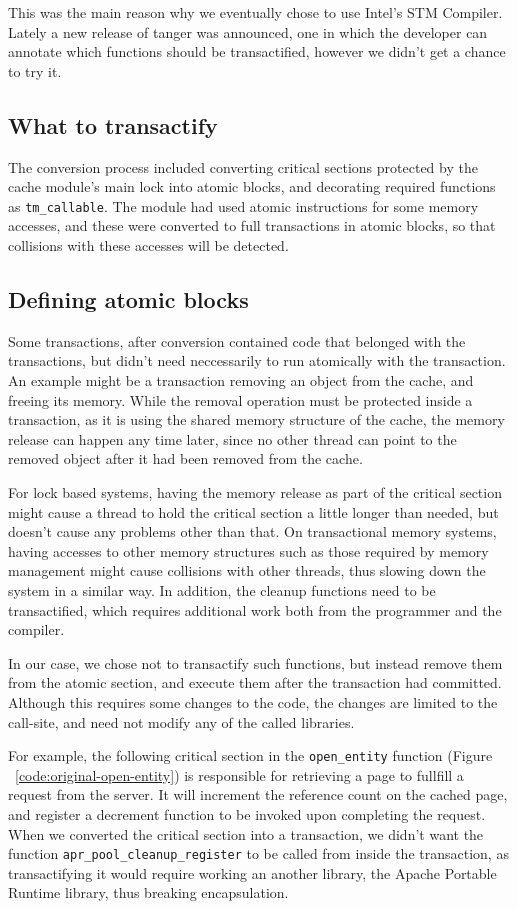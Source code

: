 \documentclass[preprint,natbib,11pt]{sigplanconf}
\begin{document}
This was the main reason why we eventually chose to use Intel's STM Compiler.
Lately a new release of tanger was announced, one in which the developer can
annotate which functions should be transactified, however we didn't get a
chance to try it.

\subsection{What to transactify}
The conversion process included
converting critical sections protected by the cache module's main lock into
atomic blocks, and decorating required functions as {\tt tm\_callable}. The
module had used atomic instructions for some memory accesses, and these were
converted to full transactions in atomic blocks, so that collisions with these
accesses will be detected.

\subsection{Defining atomic blocks}
Some transactions, after conversion contained code that belonged with the
transactions, but didn't need neccessarily to run atomically with the
transaction. An example might be a transaction removing an object from the
cache, and freeing its memory. While the removal operation must be protected
inside a transaction, as it is using the shared memory structure of the cache,
the memory release can happen any time later, since no other thread can point to
the removed object after it had been removed from the cache. 

For lock based systems, having the memory release as part of the critical
section might cause a thread to hold the critical section a little longer than
needed, but doesn't cause any problems other than that. On transactional memory
systems, having accesses to other memory structures such as those required by
memory management might cause collisions with other threads, thus slowing down
the system in a similar way. In addition, the cleanup functions need to be
transactified, which requires additional work both from the programmer and the
compiler.

In our case, we chose not to transactify such functions, but instead remove them
from the atomic section, and execute them after the transaction had committed.
Although this requires some changes to the code, the changes are limited to the
call-site, and need not modify any of the called libraries.

For example, the following critical section in the {\tt open\_entity} function
(Figure ~\ref{code:original-open-entity}) is responsible for retrieving a page
to fullfill a request from the server. It will increment the reference count on
the cached page, and register a decrement function to be invoked upon completing
the request. When we converted the critical section into a transaction, we
didn't want the function {\tt apr\_pool\_cleanup\_register} to be called from
inside the transaction, as transactifying it would require working an another
library, the Apache Portable Runtime library, thus breaking encapsulation.
\end{document}
